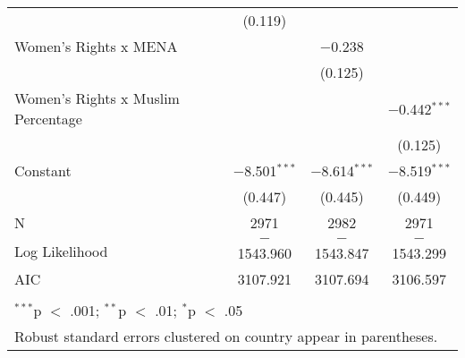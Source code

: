 \begin{table}[!htbp]
\begin{tabular}{@{\extracolsep{5pt}}lccc}
  & (0.119) &  &  \\ 
  Women's Rights x MENA &  & $-$0.238 &  \\ 
  &  & (0.125) &  \\ 
  Women's Rights x Muslim Percentage &  &  & $-$0.442$^{***}$ \\ 
  &  &  & (0.125) \\ 
  Constant & $-$8.501$^{***}$ & $-$8.614$^{***}$ & $-$8.519$^{***}$ \\ 
  & (0.447) & (0.445) & (0.449) \\ 
 N & 2971 & 2982 & 2971 \\ 
Log Likelihood & $-$1543.960 & $-$1543.847 & $-$1543.299 \\ 
AIC & 3107.921 & 3107.694 & 3106.597 \\ 
\hline \\[-1.8ex] 
\multicolumn{4}{l}{$^{***}$p $<$ .001; $^{**}$p $<$ .01; $^{*}$p $<$ .05} \\ 
\multicolumn{4}{l}{Robust standard errors clustered on country appear in parentheses.} \\ 
\end{tabular} 
\end{table} 
